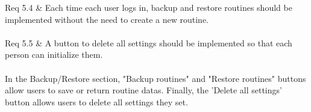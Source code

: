 \begin{enumerate}[label=\arabic*.]
\begin{enumerate}[label*={\arabic*.},ref=\theenumi.\arabic*]
{                              Req 5.4 & Each time each user logs in, backup and restore routines should be implemented without the need to create a new routine.\\\\
                              Req 5.5 & A button to delete all settings should be implemented so that each person can initialize them.\\\\
                          }
                          In the Backup/Restore section, "Backup routines" and "Restore routines" buttons allow users to save or return routine datas. Finally, the 'Delete all settings' button allows users to delete all settings they set.\\\\
          \end{enumerate}
\end{enumerate}